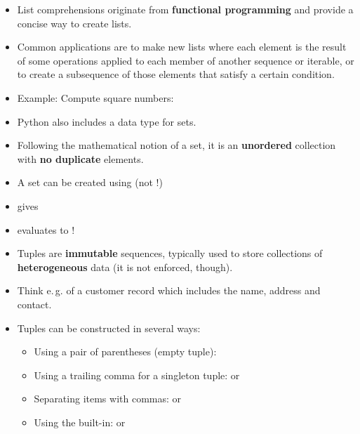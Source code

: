 \begin{frame}
	\begin{itemize}
		\item List comprehensions originate from \textbf{functional programming} and provide a concise way to create lists.
		\item Common applications are to make new lists where each element is the result of some operations applied to each member of
			another sequence or iterable, or to create a subsequence of those elements that satisfy a certain condition.
		\item Example: Compute square numbers:
	\end{itemize}
	
	
\end{frame}


\begin{frame}
	\begin{itemize}
		\item Python also includes a data type for sets.
		\item Following the mathematical notion of a set, it is an \textbf{unordered} collection with \textbf{no duplicate} elements.
		\item A set can be created using  (not \code{\{\}}!)
		\item {} gives 
		\item {} evaluates to !
	\end{itemize}
\end{frame}


\begin{frame}
	\begin{itemize}
		\item Tuples are \textbf{immutable} sequences, typically used to store collections of \textbf{heterogeneous} data (it is not enforced, though).
		\item Think e.\,g. of a customer record which includes the name, address and contact.
		\item Tuples can be constructed in several ways:
		\begin{itemize}
			\item Using a pair of parentheses (empty tuple): \code{()}
			\item Using a trailing comma for a singleton tuple:  or 
			\item Separating items with commas:  or 
			\item Using the  built-in:  or 
		\end{itemize}
	\end{itemize}
\end{frame}


